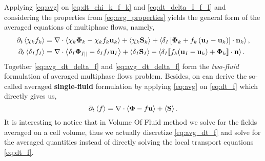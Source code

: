 Applying \ref{eq:avg} on \ref{eq:dt_chi_k_f_k} and \ref{eq:dt_delta_I_f_I} and considering the properties from \ref{eq:avg_properties} yields the general form of the averaged equations of multiphase flows, namely,
\begin{align}
    \partial_t \left<\chi_k f_k\right>
    &= \mathbf{\nabla} \cdot \left<\chi_k \mathbf{\Phi}_k - \chi_k f_k \textbf{u}_k\right>
    + \left<\chi_k \textbf{S}_k\right>
    + \left<\delta_I\left[
        \mathbf{\Phi}_k
        + f_k
        \left(
            \textbf{u}_I
            - \textbf{u}_k
        \right)
    \right]
    \cdot \textbf{n}_k\right> ,
    \label{eq:avg_dt_chi_f}\\
    \partial_t \left<\delta_If_I\right>
    &= 
    \mathbf{\nabla} \cdot \left<\delta_I \mathbf{\Phi}_{I||} - \delta_I f_I \textbf{u}_I\right>
    +\left<\delta_I\textbf{S}_I\right> 
    - \left<\delta_I \llbracket 
    f_k (\textbf{u}_I - \textbf{u}_k)
    + \mathbf{\Phi}_k
     \rrbracket \cdot \textbf{n} \right>.
    \label{eq:avg_dt_delta_f}
\end{align}
Together \ref{eq:avg_dt_delta_f}  and \ref{eq:avg_dt_delta_f}  form the \textit{two-fluid} formulation of averaged multiphase flows problem. 
Besides, on can derive the so-called averaged \textbf{single-fluid} formulation by applying \ref{eq:avg} on \ref{eq:dt_f} which directly gives us, 
\begin{equation}
    \partial_t \left<f\right>
    = \mathbf{\nabla} \cdot \left<\mathbf{\Phi} - f \textbf{u}\right>
    + \left<\textbf{S}\right>.
    \label{eq:avg_dt_f}
\end{equation}
It is interesting to notice that in Volume Of Fluid method we solve for the fields averaged on a cell volume, thus we actually discretize \ref{eq:avg_dt_f} and solve for the averaged quantities \citep{popinet2018numerical,tryggvason2011direct} instead of directly solving the local transport equations \ref{eq:dt_f}.

